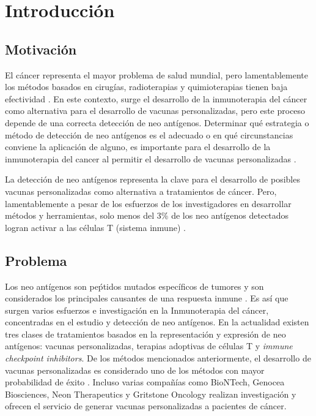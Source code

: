 \chapter{Introducción}
\label{cap:introduccion}


\section{Motivación}
\label{sec:motivacion}
El cáncer representa el mayor problema de salud mundial, pero lamentablemente los métodos basados en cirugías, radioterapias y quimioterapias tienen baja efectividad \citep{peng2019neoantigen}. En este contexto, surge el desarrollo de la inmunoterapia del cáncer como alternativa para el desarrollo de vacunas personalizadas, pero este proceso depende de una correcta detección de neo antígenos. Determinar qué estrategia o método de detección de neo antígenos es el adecuado o en qué circunstancias conviene la aplicación de alguno, es importante para el desarrollo de la inmunoterapia del cancer al permitir el desarrollo de vacunas personalizadas \citep{de2020neoantigen, peng2019neoantigen}. 


La detección de neo antígenos representa la clave para el desarrollo de posibles vacunas personalizadas como alternativa a tratamientos de cáncer. Pero, lamentablemente a pesar de los esfuerzos de los investigadores en desarrollar métodos y herramientas, solo menos del 3\% de los neo antígenos detectados logran activar a las células T (sistema inmune) \citep{de2020neoantigen}. 

\section{Problema}
\label{sec:problema}

Los neo antígenos son peṕtidos mutados específicos de tumores y son considerados los principales causantes de una respuesta inmune \citep{borden2022cancer, chen2021challenges, gopanenko2020main}. Es así que surgen varios esfuerzos e investigación en la Inmunoterapia del cáncer, concentradas en el estudio y detección de neo antígenos. En la actualidad existen tres clases de tratamientos basados en la representación y expresión de neo antígenos: vacunas personalizadas, terapias adoptivas de células T y \textit{immune checkpoint inhibitors}. De los métodos mencionados anteriormente, el desarrollo de vacunas personalizadas es considerado uno de los métodos con mayor probabilidad de éxito \citep{borden2022cancer}. Incluso varias compañías como BioNTech, Genocea Biosciences, Neon Therapeutics y Gritstone Oncology realizan investigación y ofrecen el servicio de generar vacunas personalizadas a pacientes de cáncer.

